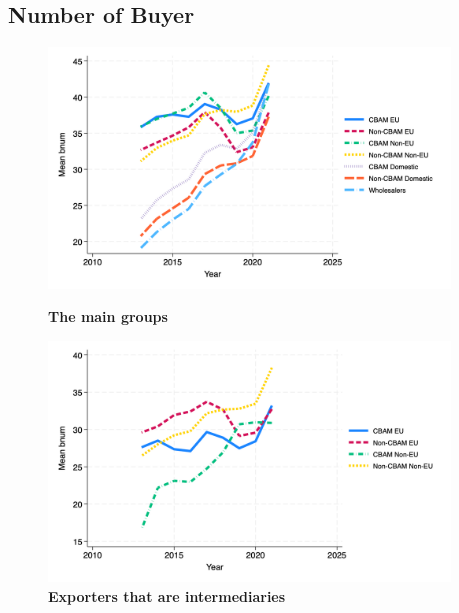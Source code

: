\documentclass{article}
\begin{document}
\subsection{Number of Buyer}
\begin{figure}[H]
\centering
\includegraphics[width=0.95\textwidth]{bnum_main_groups.png}
\caption{\textbf{The main groups}}
\includegraphics[width=0.95\textwidth]{bnum_ei.png}
\caption{\textbf{Exporters that are intermediaries}}
\end{figure}
\end{document}
